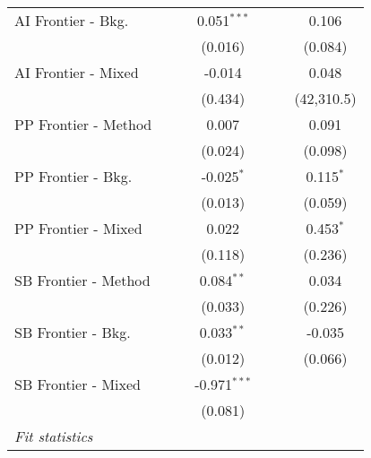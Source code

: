 \begin{tabular}{lcccccc}
   AI Frontier - Bkg.   &               &               & 0.051$^{***}$  &               &              & 0.106\\   
                        &               &               & (0.016)        &               &              & (0.084)\\   
   AI Frontier - Mixed  &               &               & -0.014         &               &              & 0.048\\   
                        &               &               & (0.434)        &               &              & (42,310.5)\\   
   PP Frontier - Method &               &               & 0.007          &               &              & 0.091\\   
                        &               &               & (0.024)        &               &              & (0.098)\\   
   PP Frontier - Bkg.   &               &               & -0.025$^{*}$   &               &              & 0.115$^{*}$\\   
                        &               &               & (0.013)        &               &              & (0.059)\\   
   PP Frontier - Mixed  &               &               & 0.022          &               &              & 0.453$^{*}$\\   
                        &               &               & (0.118)        &               &              & (0.236)\\   
   SB Frontier - Method &               &               & 0.084$^{**}$   &               &              & 0.034\\   
                        &               &               & (0.033)        &               &              & (0.226)\\   
   SB Frontier - Bkg.   &               &               & 0.033$^{**}$   &               &              & -0.035\\   
                        &               &               & (0.012)        &               &              & (0.066)\\   
   SB Frontier - Mixed  &               &               & -0.971$^{***}$ &               &              &   \\   
                        &               &               & (0.081)        &               &              &   \\   
   \midrule
   \emph{Fit statistics}\\

\end{tabular}

